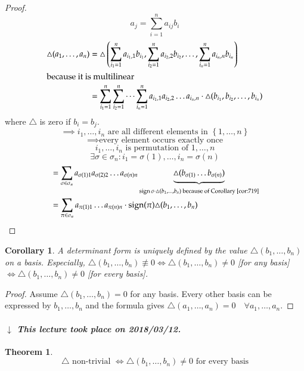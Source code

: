 \documentclass[a4paper]{article}
\newcounter{lecref}[section]
\numberwithin{lecref}{section}
\newtheorem{theorem}[lecref]{Theorem}
\newtheorem{corollary}[lecref]{Corollary}
\newcommand{\set}[1]{\left\{#1\right\}}
\newcommand{\dateref}[1]{%
  \begin{mdframed}[backgroundcolor=gray!10,innerbottommargin=0pt,innertopmargin=0pt]
    \paragraph{\textit{$\downarrow$ This lecture took place on #1.}}%
  \end{mdframed}%
}
\DeclareMathOperator{\sign}{sign}
\begin{document}
\begin{proof}
  \[ a_j = \sum_{i=1}^n a_{ij} b_i \]
  \begin{align*}
    \triangle(a_1, \dots, a_n) &= \triangle\left(\sum_{i_1 = 1}^n a_{i_1,1} b_{i_1}, \sum_{i_2 = 1}^n a_{i_2,2} b_{i_2}, \dots, \sum_{i_n = 1}^n a_{i_n, n} b_{i_n}\right) \\
    \intertext{because it is multilinear}
      &= \sum_{i_1 = 1}^n \sum_{i_2=1}^n \dots \sum_{i_n=1}^n a_{i_1,1} a_{i_2,2} \dots a_{i_n,n} \cdot \triangle(b_{i_1}, b_{i_2}, \dots, b_{i_n})
  \end{align*}
  where $\triangle$ is zero if $b_i = b_j$.
  \[ \implies i_1,\dots,i_n \text{ are all different elements in } \set{1,\dots,n} \]
  \[ \implies \text{every element occurs exactly once} \]
  \[ i_1,\dots,i_n \text{ is permutation of } 1,\dots,n \]
  \[ \exists \sigma \in \sigma_n: i_1 = \sigma(1), \dots, i_n = \sigma(n) \]
  \begin{align*}
    &= \sum_{\sigma \in \sigma_n} a_{\sigma(1) 1} a_{\sigma(2) 2} \dots a_{\sigma(n) n} \underbrace{\triangle(b_{\sigma(1)} \dots b_{\sigma(n)})}_{\sign\sigma \cdot \triangle(b_1, \dots, b_n) \text{ because of Corollary~\ref{cor:719}}} \\
    &= \sum_{\pi \in \sigma_n} a_{\pi(1) 1} \dots a_{\pi(n) n} \cdot \sign(\pi) \triangle(b_1, \dots, b_n)
  \end{align*}
\end{proof}

\begin{corollary}
  A determinant form is uniquely defined by the value $\triangle(b_1, \dots, b_n)$ on a basis.
  Especially, $\triangle(b_1, \dots, b_n) \not\equiv 0 \iff \triangle(b_1,\dots,b_n) \neq 0$ [for any basis] $\iff \triangle(b_1,\dots,b_n) \neq 0$ [for every basis].
\end{corollary}

\begin{proof}
  Assume $\triangle(b_1,\dots,b_n) = 0$ for any basis.
  Every other basis can be expressed by $b_1, \dots ,b_n$ and the formula gives $\triangle(a_1, \dots, a_n) = 0 \quad \forall a_1,\dots,a_n$.
\end{proof}

\dateref{2018/03/12}

\begin{theorem} %
  \[ \triangle \text{ non-trivial } \iff \triangle(b_1, \dots, b_n) \neq 0 \text{ for every basis} \]
\end{theorem}
\end{document}
